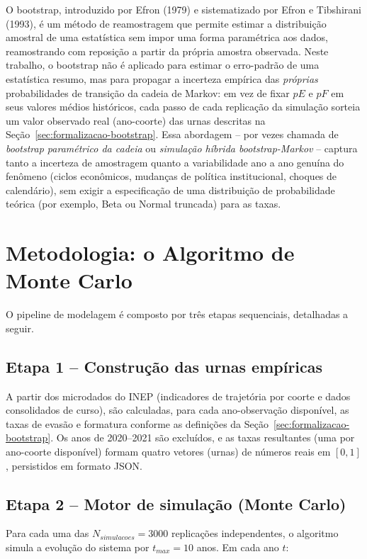 \documentclass[12pt,times,article,chapter=TITLE]{abnt}
\begin{document}
O bootstrap, introduzido por Efron (1979) e sistematizado por Efron e Tibshirani (1993), é um método de reamostragem que permite estimar a distribuição amostral de uma estatística sem impor uma forma paramétrica aos dados, reamostrando com reposição a partir da própria amostra observada. Neste trabalho, o bootstrap não é aplicado para estimar o erro-padrão de uma estatística resumo, mas para propagar a incerteza empírica das \emph{próprias} probabilidades de transição da cadeia de Markov: em vez de fixar $pE$ e $pF$ em seus valores médios históricos, cada passo de cada replicação da simulação sorteia um valor observado real (ano-coorte) das urnas descritas na Seção~\ref{sec:formalizacao-bootstrap}. Essa abordagem -- por vezes chamada de \emph{bootstrap paramétrico da cadeia} ou \emph{simulação híbrida bootstrap-Markov} -- captura tanto a incerteza de amostragem quanto a variabilidade ano a ano genuína do fenômeno (ciclos econômicos, mudanças de política institucional, choques de calendário), sem exigir a especificação de uma distribuição de probabilidade teórica (por exemplo, Beta ou Normal truncada) para as taxas.


\chapter{Metodologia: o Algoritmo de Monte Carlo}
\label{sec:algoritmo}

O pipeline de modelagem é composto por três etapas sequenciais, detalhadas a seguir.

\section{Etapa 1 -- Construção das urnas empíricas}

A partir dos microdados do INEP (indicadores de trajetória por coorte e dados consolidados de curso), são calculadas, para cada ano-observação disponível, as taxas de evasão e formatura conforme as definições da Seção~\ref{sec:formalizacao-bootstrap}. Os anos de 2020--2021 são excluídos, e as taxas resultantes (uma por ano-coorte disponível) formam quatro vetores (urnas) de números reais em $[0,1]$, persistidos em formato JSON.

\section{Etapa 2 -- Motor de simulação (Monte Carlo)}

Para cada uma das $N_{simulacoes}=3000$ replicações independentes, o algoritmo simula a evolução do sistema por $t_{max}=10$ anos. Em cada ano $t$:
\end{document}
